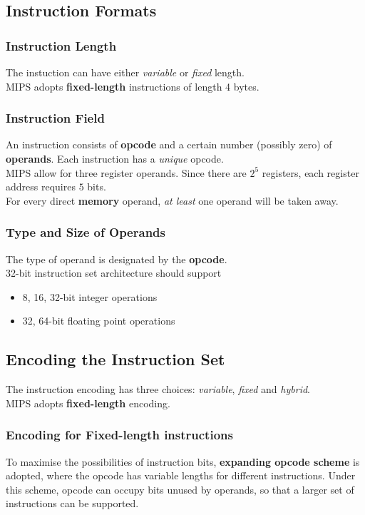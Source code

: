 \documentclass[12pt]{article}
\theoremstyle{definition}
\begin{document}
\subsection{Instruction Formats}
\subsubsection{Instruction Length}
The instuction can have either \textit{variable} or \textit{fixed} length. \\MIPS adopts \textbf{fixed-length} instructions of length 4 bytes.
\subsubsection{Instruction Field}
An instruction consists of \textbf{opcode} and a certain number (possibly zero) of \textbf{operands}. Each instruction has a \textit{unique} opcode.\\MIPS allow for three register operands. Since there are $2^5$ registers, each register address requires $5$ bits.\\For every direct \textbf{memory} operand, \textit{at least} one operand will be taken away.
\subsubsection{Type and Size of Operands}
The type of operand is designated by the \textbf{opcode}.\\32-bit instruction set architecture should support
\begin{itemize}
\item 8, 16, 32-bit integer operations
\item 32, 64-bit floating point operations
\end{itemize} 
\subsection{Encoding the Instruction Set}
The instruction encoding has three choices: \textit{variable}, \textit{fixed} and \textit{hybrid}.\\MIPS adopts \textbf{fixed-length} encoding.
\subsubsection{Encoding for Fixed-length instructions}
To maximise the possibilities of instruction bits, \textbf{expanding opcode scheme} is adopted, where the opcode has variable lengths for different instructions. Under this scheme, opcode can occupy bits unused by operands, so that a larger set of instructions can be supported.
\end{document}
